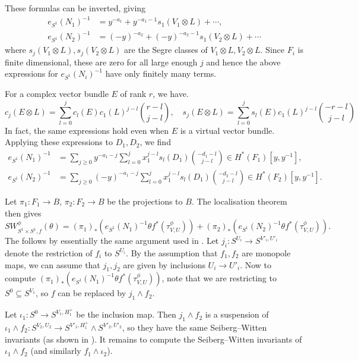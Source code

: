 \documentclass{amsart}
\theoremstyle{definition}
\theoremstyle{remark}
\numberwithin{equation}{section}
\begin{document}
These formulas can be inverted, giving
\begin{align*}
e_{S^1}(N_1)^{-1} &= y^{-a_1} + y^{-a_1-1}s_1(V_1 \otimes L) + \cdots, \\
e_{S^1}(N_2)^{-1} &= (-y)^{-a_2} + (-y)^{-a_2-1}s_1(V_2 \otimes L) + \cdots
\end{align*}
where $s_j(V_1 \otimes L), s_j(V_2 \otimes L)$ are the Segre classes of $V_1 \otimes L,V_2 \otimes L$. Since $F_i$ is finite dimensional, these are zero for all large enough $j$ and hence the above expressions for $e_{S^1}(N_i)^{-1}$ have only finitely many terms.

For a complex vector bundle $E$ of rank $r$, we have.
\[
c_j( E \otimes L) = \sum_{l = 0}^{j} c_l(E) c_1(L)^{j-l} \binom{r-l}{j-l}, \quad s_j( E \otimes L) = \sum_{l = 0}^{j} s_l(E) c_1(L)^{j-l} \binom{-r-l}{j-l}
\]
In fact, the same expressions hold even when $E$ is a virtual vector bundle. Applying these expressions to $D_1, D_2$, we find
\begin{align*}
e_{S^1}(N_1)^{-1} &= \sum_{j \ge 0} y^{-a_1-j} \sum_{l=0}^j x_1^{j-l} s_l(D_1) \binom{ -d_1 - l}{j-l} \in H^*(F_1)[y,y^{-1}], \\
e_{S^1}(N_2)^{-1} &= \sum_{j \ge 0} (-y)^{-a_1-j} \sum_{l=0}^j x_1^{j-l} s_l(D_1) \binom{ -d_2 - l}{j-l} \in H^*(F_2)[y,y^{-1}].
\end{align*}

Let $\pi_1 : F_1 \to B$, $\pi_2 : F_2 \to B$ be the projections to $B$. The localisation theorem then gives
\begin{equation}\label{equ:loc1}
SW_{S^1 \times S^1,f}^{\phi}(\theta) = (\pi_1)_*( e_{S^1}(N_1)^{-1} \theta f^*(\tau^\phi_{V,U})) + (\pi_2)_*( e_{S^1}(N_2)^{-1} \theta f^*( \tau^\phi_{V,U} )).
\end{equation}
The follows by essentially the same argument used in \cite[]{bar2}. Let $j_i : S^{U_i} \to S^{V'_i , U'_i}$ denote the restriction of $f_i$ to $S^{U_i}$. By the assumption that $f_1,f_2$ are monopole maps, we can assume that $j_1,j_2$ are given by inclusions $U_i \to U'_i$. Now to compute $(\pi_1)_*( e_{S^1}(N_1)^{-1} \theta f^*(\tau^\phi_{V,U}))$, note that we are restricting to $S^0 \subseteq S^{V_1}$, so $f$ can be replaced by $j_1 \wedge f_2$.

Let $\iota_1 : S^0 \to S^{V_1 , H^+_1}$ be the inclusion map. Then $j_1 \wedge f_2$ is a suspension of $\iota_1 \wedge f_2 : S^{V_2 , U_2} \to S^{V'_1 , H^+_1} \wedge S^{V'_2 , U'_2}$, so they have the same Seiberg--Witten invariants (as shown in \cite[Proposition 3.8]{bk}). It remains to compute the Seiberg--Witten invariants of $\iota_1 \wedge f_2$ (and similarly $f_1 \wedge \iota_2$).
\end{document}
